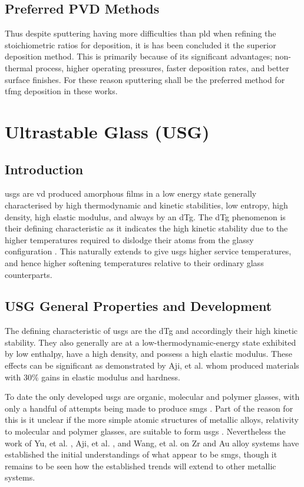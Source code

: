 \documentclass[a4paper,12pt,oneside]{report}%
\begin{document}
\subsection{Preferred PVD Methods}
Thus despite sputtering having more difficulties than \gls{pld} when refining the stoichiometric ratios for deposition, it is has been concluded it the superior deposition method. This is primarily because of its significant advantages; non-thermal process, higher operating pressures, faster deposition rates, and better surface finishes. For these reason sputtering shall be the preferred method for \gls{tfmg} deposition in these works. 

\section{Ultrastable Glass (USG)} 
\subsection{Introduction}
\Glspl{usg} are \gls{vd} produced amorphous films in a low energy state generally characterised by high thermodynamic and kinetic stabilities, low entropy, high density, high elastic modulus, and always by an \gls{dTg}. The \gls{dTg} phenomenon is their defining characteristic as it indicates the high kinetic stability due to the higher temperatures required to dislodge their atoms from the glassy configuration \cite{Swallen2007, Dawson2011}. This naturally extends to give \glspl{usg} higher service temperatures, and hence higher softening temperatures relative to their ordinary glass counterparts. 

\subsection{USG General Properties and Development}
The defining characteristic of \glspl{usg} are the \gls{dTg} and accordingly their high kinetic stability. They also generally are at a low-thermodynamic-energy state exhibited by low enthalpy, have a high density, and possess a high elastic modulus. These effects can be significant as demonstrated by Aji, et al. \cite{Aji2013} whom produced materials with 30\% gains in elastic modulus and hardness. 

To date the only developed \glspl{usg} are organic, molecular and polymer glasses, with only a handful of attempts being made to produce \glspl{smg} \cite{Aji2013, Yu2013, Wang2014}. Part of the reason for this is it unclear if the more simple atomic structures of metallic alloys, relativity to molecular and polymer glasses, are suitable to form \glspl{usg} \cite{Yu2013}. Nevertheless the work of Yu, et al. \cite{Yu2013}, Aji, et al. \cite{Aji2013}, and Wang, et al. \cite{Wang2014} on Zr and Au alloy systems have established the initial understandings of what appear to be \glspl{smg}, though it remains to be seen how the established trends will extend to other metallic systems. 
\end{document}
